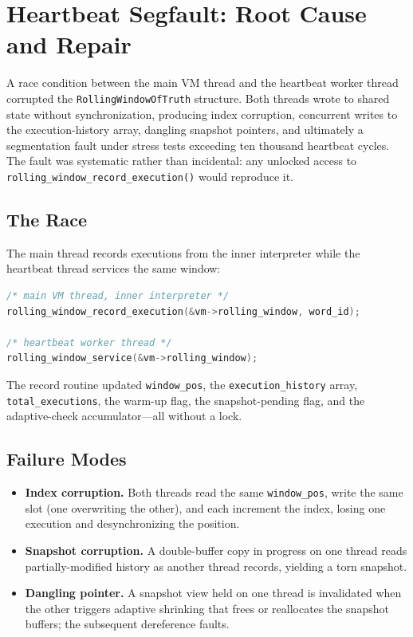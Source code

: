 
\section{Heartbeat Segfault: Root Cause and Repair}

A race condition between the main VM thread and the heartbeat worker thread
corrupted the \lstinline{RollingWindowOfTruth} structure. Both threads wrote to
shared state without synchronization, producing index corruption, concurrent
writes to the execution-history array, dangling snapshot pointers, and
ultimately a segmentation fault under stress tests exceeding ten thousand
heartbeat cycles. The fault was systematic rather than incidental: any unlocked
access to \lstinline{rolling_window_record_execution()} would reproduce it.

\subsection{The Race}

The main thread records executions from the inner interpreter while the
heartbeat thread services the same window:

\begin{lstlisting}[language=C]
/* main VM thread, inner interpreter */
rolling_window_record_execution(&vm->rolling_window, word_id);

/* heartbeat worker thread */
rolling_window_service(&vm->rolling_window);
\end{lstlisting}

The record routine updated \lstinline{window_pos}, the
\lstinline{execution_history} array, \lstinline{total_executions}, the warm-up
flag, the snapshot-pending flag, and the adaptive-check accumulator---all
without a lock.

\subsection{Failure Modes}

\begin{itemize}
  \item \textbf{Index corruption.} Both threads read the same
        \lstinline{window_pos}, write the same slot (one overwriting the
        other), and each increment the index, losing one execution and
        desynchronizing the position.
  \item \textbf{Snapshot corruption.} A double-buffer copy in progress on one
        thread reads partially-modified history as another thread records,
        yielding a torn snapshot.
  \item \textbf{Dangling pointer.} A snapshot view held on one thread is
        invalidated when the other triggers adaptive shrinking that frees or
        reallocates the snapshot buffers; the subsequent dereference faults.
\end{itemize}

